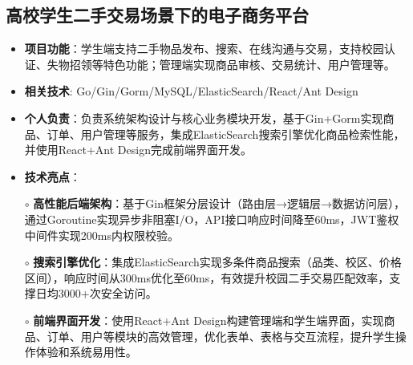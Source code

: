 \subsection{\textbf{高校学生二手交易场景下的电子商务平台} \hspace{2cm}{2024.10 -- 2024.12}}
  \begin{normalsize}
    \begin{itemize}
    \item \textbf{项目功能}：学生端支持二手物品发布、搜索、在线沟通与交易，支持校园认证、失物招领等特色功能；管理端实现商品审核、交易统计、用户管理等。
    \item \textbf{相关技术}: Go/Gin/Gorm/MySQL/ElasticSearch/React/Ant Design
    \item \textbf{个人负责}：负责系统架构设计与核心业务模块开发，基于Gin+Gorm实现商品、订单、用户管理等服务，集成ElasticSearch搜索引擎优化商品检索性能，并使用React+Ant Design完成前端界面开发。
    \item \textbf{技术亮点}：
    \setlength{\itemindent}{1em} %
      \item[$\circ$] \textbf{高性能后端架构}：基于Gin框架分层设计（路由层→逻辑层→数据访问层），通过Goroutine实现异步非阻塞I/O，API接口响应时间降至60ms，JWT鉴权中间件实现200ms内权限校验。
      \item[$\circ$] \textbf{搜索引擎优化}：集成ElasticSearch实现多条件商品搜索（品类、校区、价格区间），响应时间从300ms优化至60ms，有效提升校园二手交易匹配效率，支撑日均3000+次安全访问。
      \item[$\circ$] \textbf{前端界面开发}：使用React+Ant Design构建管理端和学生端界面，实现商品、订单、用户等模块的高效管理，优化表单、表格与交互流程，提升学生操作体验和系统易用性。
    \end{itemize}
  \end{normalsize}